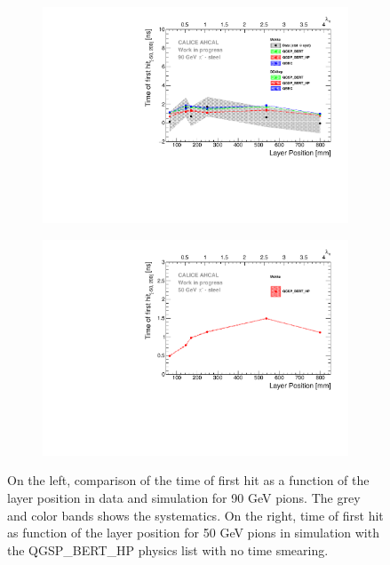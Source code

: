 \begin{figure}[htbp!]
	\begin{subfigure}[t]{0.5\textwidth}
		\centering
		\includegraphics[width=1\textwidth]{../Thesis_Plots/Timing/Pions/Plots/ComparisonToSim/Time_Depth_90GeV.pdf}
		\caption{} \label{fig:Depth_SimData_Comparison}
	\end{subfigure}
	\hfill
	\begin{subfigure}[t]{0.5\textwidth}
		\centering
		\includegraphics[width=1\textwidth]{../Thesis_Plots/Timing/Pions/Plots/Time_Depth_50GeV_QGSP_BERT_HP_noSmearing.pdf}
		\caption{}\label{fig:Depth_Sim_noSmearing}
	\end{subfigure}
	\caption{On the left, comparison of the time of first hit as a function of the layer position in data and simulation for 90 GeV pions. The grey and color bands shows the systematics. On the right, time of first hit as function of the layer position for 50 GeV pions in simulation with the QGSP\_BERT\_HP physics list with no time smearing.}
\end{figure}

